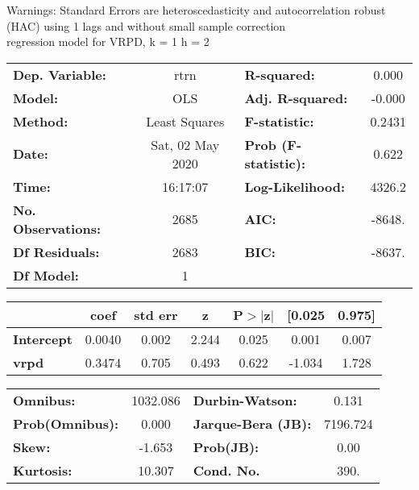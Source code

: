 Warnings: \newline
 [1] Standard Errors are heteroscedasticity and autocorrelation robust (HAC) using 1 lags and without small sample correction\\ 

regression model for VRPD, k = 1 h = 2\begin{center}
\begin{tabular}{lclc}
\toprule
\textbf{Dep. Variable:}    &       rtrn       & \textbf{  R-squared:         } &     0.000   \\
\textbf{Model:}            &       OLS        & \textbf{  Adj. R-squared:    } &    -0.000   \\
\textbf{Method:}           &  Least Squares   & \textbf{  F-statistic:       } &    0.2431   \\
\textbf{Date:}             & Sat, 02 May 2020 & \textbf{  Prob (F-statistic):} &    0.622    \\
\textbf{Time:}             &     16:17:07     & \textbf{  Log-Likelihood:    } &    4326.2   \\
\textbf{No. Observations:} &        2685      & \textbf{  AIC:               } &    -8648.   \\
\textbf{Df Residuals:}     &        2683      & \textbf{  BIC:               } &    -8637.   \\
\textbf{Df Model:}         &           1      & \textbf{                     } &             \\
\bottomrule
\end{tabular}
\begin{tabular}{lcccccc}
                   & \textbf{coef} & \textbf{std err} & \textbf{z} & \textbf{P$> |$z$|$} & \textbf{[0.025} & \textbf{0.975]}  \\
\midrule
\textbf{Intercept} &       0.0040  &        0.002     &     2.244  &         0.025        &        0.001    &        0.007     \\
\textbf{vrpd}      &       0.3474  &        0.705     &     0.493  &         0.622        &       -1.034    &        1.728     \\
\bottomrule
\end{tabular}
\begin{tabular}{lclc}
\textbf{Omnibus:}       & 1032.086 & \textbf{  Durbin-Watson:     } &    0.131  \\
\textbf{Prob(Omnibus):} &   0.000  & \textbf{  Jarque-Bera (JB):  } & 7196.724  \\
\textbf{Skew:}          &  -1.653  & \textbf{  Prob(JB):          } &     0.00  \\
\textbf{Kurtosis:}      &  10.307  & \textbf{  Cond. No.          } &     390.  \\
\bottomrule
\end{tabular}
\end{center}

